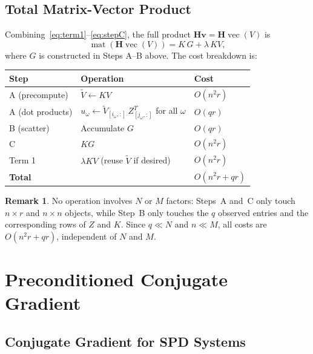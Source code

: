 \documentclass[12pt]{article}
\theoremstyle{definition}
\newtheorem{remark}[theorem]{Remark}
\DeclareMathOperator{\vecop}{vec}
\DeclareMathOperator{\mat}{mat}
\newcommand{\bH}{\mathbf{H}}
\newcommand{\bv}{\mathbf{v}}
\begin{document}
\subsection{Total Matrix-Vector Product}

Combining~\eqref{eq:term1}--\eqref{eq:stepC}, the full product
$\bH\bv = \bH\vecop(V)$ is
\begin{equation}\label{eq:matvec}
  \mat(\bH\vecop(V)) = K\,G + \lambda\,KV,
\end{equation}
where $G$ is constructed in Steps A--B above.  The cost breakdown is:

\begin{center}
\begin{tabular}{lll}
\hline
Step & Operation & Cost \\
\hline
A (precompute) & $\widetilde{V}\gets KV$ & $O(n^2 r)$ \\
A (dot products) & $u_\omega\gets \widetilde{V}_{[i_\omega,:]}\,Z_{[j_\omega,:]}^T$ for all $\omega$ & $O(qr)$ \\
B (scatter) & Accumulate $G$ & $O(qr)$ \\
C & $KG$ & $O(n^2 r)$ \\
Term 1 & $\lambda KV$ (reuse $\widetilde{V}$ if desired) & $O(n^2 r)$ \\
\hline
\textbf{Total} & & $O(n^2 r + qr)$ \\
\hline
\end{tabular}
\end{center}

\begin{remark}
  No operation involves $N$ or $M$ factors: Steps~A and~C only touch $n\times r$
  and $n\times n$ objects, while Step~B only touches the $q$ observed entries and
  the corresponding rows of $Z$ and $K$.  Since $q\ll N$ and $n\ll M$, all costs
  are $O(n^2r+qr)$, independent of $N$ and $M$.
\end{remark}

\section{Preconditioned Conjugate Gradient}

\subsection{Conjugate Gradient for SPD Systems}
\end{document}
